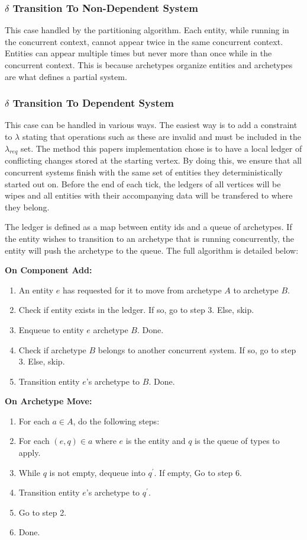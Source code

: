 \subsubsection{$\delta$ Transition To Non-Dependent System}
This case handled by the partitioning algorithm. Each entity, while running in the concurrent context, cannot appear twice in the same concurrent context. Entities can appear multiple times but never more than once while in the concurrent context. This is because archetypes organize entities and archetypes are what defines a partial system. 

\subsubsection{$\delta$ Transition To Dependent System}
This case can be handled in various ways. The easiest way is to add a constraint to $\lambda$ stating that operations such as these are invalid and must be included in the $\lambda_{req}$ set. The method this papers implementation chose is to have a local ledger of conflicting changes stored at the starting vertex. By doing this, we ensure that all concurrent systems finish with the same set of entities they deterministically started out on. Before the end of each tick, the ledgers of all vertices will be wipes and all entities with their accompanying data will be transfered to where they belong.

The ledger is defined as a map between entity ids and a queue of archetypes. If the entity wishes to transition to an archetype that is running concurrently, the entity will push the archetype to the queue. The full algorithm is detailed below:


\textbf{On Component Add:}
\begin{enumerate}
    \item An entity $e$ has requested for it to move from archetype $A$ to archetype $B$.
    \item Check if entity exists in the ledger. If so, go to step 3. Else, skip.
    \item Enqueue to entity $e$ archetype $B$. Done.
    \item Check if archetype $B$ belongs to another concurrent system. If so, go to step 3. Else, skip.
    \item Transition entity $e$'s archetype to $B$. Done.
\end{enumerate}

\textbf{On Archetype Move:}
\begin{enumerate}
    \item For each $a \in A$, do the following steps:
    \item For each $(e, q) \in a$ where $e$ is the entity and $q$ is the queue of types to apply.
    \item While $q$ is not empty, dequeue into $q^\prime$. If empty, Go to step 6.
    \item Transition entity $e$'s archetype to $q^\prime$.
    \item Go to step 2.
    \item Done.
\end{enumerate}

